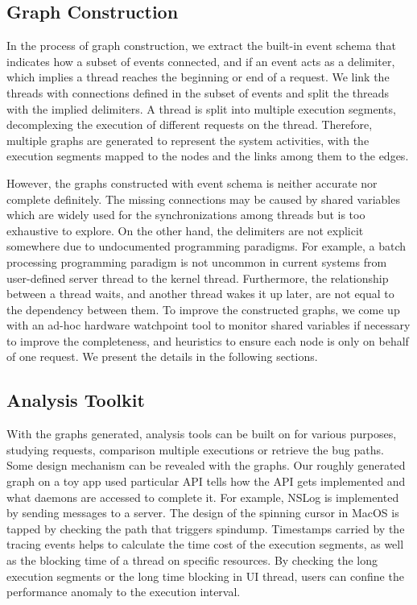 \subsection{Graph Construction}
In the process of graph construction, we extract the built-in event schema that indicates how a subset of events connected, and if an event acts as a delimiter, which implies a thread reaches the beginning or end of a request.
We link the threads with connections defined in the subset of events and split the threads with the implied delimiters.
A thread is split into multiple execution segments, decomplexing the execution of different requests on the thread.
Therefore, multiple graphs are generated to represent the system activities, with the execution segments mapped to the nodes and the links among them to the edges.

However, the graphs constructed with event schema is neither accurate nor complete definitely.
The missing connections may be caused by shared variables which are widely used for the synchronizations among threads but is too exhaustive to explore.
On the other hand, the delimiters are not explicit somewhere due to undocumented programming paradigms.
For example, a batch processing programming paradigm is not uncommon in current systems from user-defined server thread to the kernel thread.
Furthermore, the relationship between a thread waits, and another thread wakes it up later, are not equal to the dependency between them.
To improve the constructed graphs, we come up with an ad-hoc hardware watchpoint tool to monitor shared variables if necessary to improve the completeness, and heuristics to ensure each node is only on behalf of one request.
We present the details in the following sections.

\subsection{Analysis Toolkit}
With the graphs generated, analysis tools can be built on for various purposes, studying requests, comparison multiple executions or retrieve the bug paths.
Some design mechanism can be revealed with the graphs.
Our roughly generated graph on a toy app used particular API tells how the API gets implemented and what daemons are accessed to complete it.
For example, NSLog is implemented by sending messages to a server.
The design of the spinning cursor in MacOS is tapped by checking the path that triggers spindump.
Timestamps carried by the tracing events helps to calculate the time cost of the execution segments, as well as the blocking time of a thread on specific resources.
By checking the long execution segments or the long time blocking in UI thread, users can confine the performance anomaly to the execution interval.
